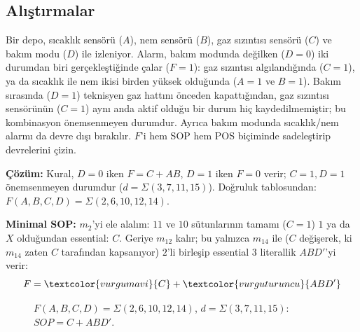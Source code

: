 \subsection{Alıştırmalar}\label{sec:dont-care-alistirma}
\begin{alistirma}[\orta]
Bir depo, sıcaklık sensörü ($A$), nem sensörü ($B$), gaz sızıntısı sensörü ($C$)
ve bakım modu ($D$) ile izleniyor. Alarm, bakım modunda değilken ($D=0$) iki
durumdan biri gerçekleştiğinde çalar ($F=1$): gaz sızıntısı algılandığında
($C=1$), ya da sıcaklık ile nem ikisi birden yüksek olduğunda ($A=1$ ve
$B=1$). Bakım sırasında ($D=1$) teknisyen gaz hattını önceden kapattığından,
gaz sızıntısı sensörünün ($C=1$) aynı anda aktif olduğu bir durum hiç
kaydedilmemiştir; bu kombinasyon önemsenmeyen durumdur. Ayrıca bakım modunda
sıcaklık/nem alarmı da devre dışı bırakılır. $F$'i hem SOP hem POS biçiminde
sadeleştirip devrelerini çizin.

\textbf{Çözüm:} Kural, $D=0$ iken $F=C+AB$, $D=1$ iken $F=0$ verir; $C=1,D=1$
önemsenmeyen durumdur ($d=\Sigma(3,7,11,15)$). Doğruluk tablosundan:
$F(A,B,C,D)=\Sigma(2,6,10,12,14)$.

\textbf{Minimal SOP:} $m_2$'yi ele alalım: $11$ ve $10$ sütunlarının tamamı
($C=1$) $1$ ya da $X$ olduğundan essential: $C$. Geriye $m_{12}$ kalır; bu
yalnızca $m_{14}$ ile ($C$ değişerek, ki $m_{14}$ zaten $C$ tarafından
kapsanıyor) $2$'li birleşip essential $3$ literallik $ABD'$'yi verir:
\[
F = \textcolor{vurgumavi}{C} + \textcolor{vurguturuncu}{ABD'}
\]

\begin{figure}[H]
\centering
{}
\caption{$F(A,B,C,D)=\Sigma(2,6,10,12,14)$, $d=\Sigma(3,7,11,15)$: $SOP=C+ABD'$.}
\label{fig:kmap-alis10-sop}
\end{figure}


\end{alistirma}
